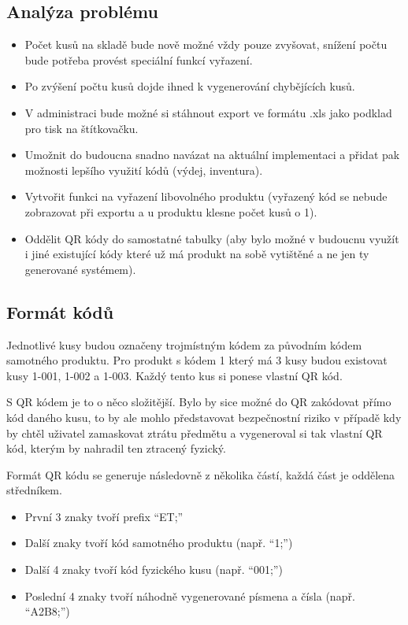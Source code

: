 \subsection{Analýza problému}

\begin{itemize}
    \item Počet kusů na skladě bude nově možné vždy pouze zvyšovat, snížení počtu bude potřeba provést speciální funkcí vyřazení.
    \item Po zvýšení počtu kusů dojde ihned k vygenerování chybějících kusů.
    \item V administraci bude možné si stáhnout export ve formátu .xls jako podklad pro tisk na štítkovačku.
    \item Umožnit do budoucna snadno navázat na aktuální implementaci a přidat pak možnosti lepšího využití kódů (výdej, inventura).
    \item Vytvořit funkci na vyřazení libovolného produktu (vyřazený kód se nebude zobrazovat při exportu a u produktu klesne počet kusů o 1).
    \item Oddělit QR kódy do samostatné tabulky (aby bylo možné v budoucnu využít i jiné existující kódy které už má produkt na sobě vytištěné a ne jen ty generované systémem).
\end{itemize}

\subsection{Formát kódů}

Jednotlivé kusy budou označeny trojmístným kódem za původním kódem samotného produktu. Pro produkt s kódem 1 který má 3 kusy budou existovat kusy 1-001, 1-002 a 1-003. Každý tento kus si ponese vlastní QR kód.

S QR kódem je to o něco složitější. Bylo by sice možné do QR zakódovat přímo kód daného kusu, to by ale mohlo představovat bezpečnostní riziko v případě kdy by chtěl uživatel zamaskovat ztrátu předmětu a vygeneroval si tak vlastní QR kód, kterým by nahradil ten ztracený fyzický. 

Formát QR kódu se generuje následovně z několika částí, každá část je oddělena středníkem.

\begin{itemize}
    \item První 3 znaky tvoří prefix \enquote{ET;}
    \item Další znaky tvoří kód samotného produktu (např.  \enquote{1;}) 
    \item Další 4 znaky tvoří kód fyzického kusu (např. \enquote{001;})
    \item Poslední 4 znaky tvoří náhodně vygenerované písmena a čísla (např. \enquote{A2B8;})
\end{itemize}

